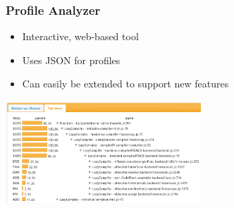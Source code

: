 \begin{frame}
\frametitle{\bf Profile Analyzer}

    \begin{itemize}
        \item Interactive, web-based tool
        \item Uses JSON for profiles
        \item Can easily be extended to support new features
    \end{itemize}

    \begin{center}
        \includegraphics[height=1.5in]{images/prof-topdown.png}
    \end{center}
\end{frame}


